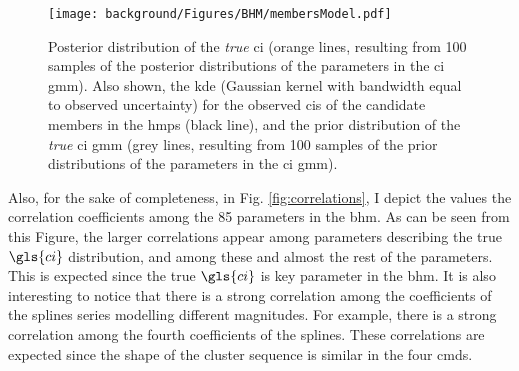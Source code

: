 \begin{figure}[ht!]
    \centering
      \texttt{[image: background/Figures/BHM/membersModel.pdf]}
\caption{Posterior distribution of the \emph{true} \gls{ci} (orange lines, resulting from 100 samples of the posterior distributions of the parameters in the \gls{ci} \gls{gmm}). Also shown, the \gls{kde} (Gaussian kernel with bandwidth equal to observed uncertainty) for the observed \glspl{ci} of the candidate members in the \gls{hmps} (black line), and the prior distribution of the \emph{true} \gls{ci} \gls{gmm} (grey lines, resulting from 100 samples of the prior distributions of the parameters in the \gls{ci} \gls{gmm}).}
\label{fig:CI_results}
\end{figure}



Also, for the sake of completeness, in Fig. \ref{fig:correlations}, I depict the values the correlation coefficients among the 85 parameters in the \gls{bhm}. As can be seen from this Figure, the larger correlations appear among parameters describing the true $\gls{ci}$ distribution, and  among these and almost the rest of the parameters. This is expected since the true $\gls{ci}$ is key parameter in the \gls{bhm}. It is also interesting to notice that there is a strong correlation among the coefficients of the splines series modelling different magnitudes. For example, there is a strong correlation among the fourth coefficients of the splines. These correlations are expected since the shape of the cluster sequence is similar in the four \glspl{cmd}.  



